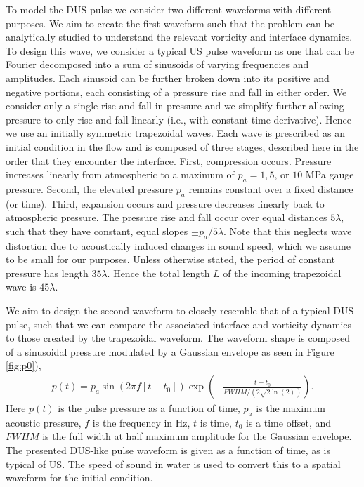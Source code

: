 To model the \ac{DUS} pulse we consider two different waveforms with
different purposes. We aim to create the first waveform such that the
problem can be analytically studied to understand the relevant
vorticity and interface dynamics. To design this wave, we consider a
typical \ac{US} pulse waveform as one that can be Fourier decomposed
into a sum of sinusoids of varying frequencies and amplitudes. Each
sinusoid can be further broken down into its positive and negative
portions, each consisting of a pressure rise and fall in either
order. We consider only a single rise and fall in pressure and we
simplify further allowing pressure to only rise and fall linearly
(i.e., with constant time derivative). Hence we use an initially
symmetric trapezoidal waves. Each wave is prescribed as an initial
condition in the flow and is composed of three stages, described here
in the order that they encounter the interface. First, compression
occurs. Pressure increases linearly from atmospheric to a maximum of
$p_a=1, 5$, or $10$ MPa gauge pressure. Second, the elevated pressure
$p_a$ remains constant over a fixed distance (or time). Third,
expansion occurs and pressure decreases linearly back to atmospheric
pressure. The pressure rise and fall occur over equal distances
$5\lambda$, such that they have constant, equal slopes
$\pm p_{a}/5\lambda$. Note that this neglects wave distortion due to
acoustically induced changes in sound speed, which we assume to be
small for our purposes. Unless otherwise stated, the period of
constant pressure has length $35\lambda$. Hence the total length $L$
of the incoming trapezoidal wave is $45\lambda$. 

We aim to design the second waveform to closely resemble that of a
typical \ac{DUS} pulse, such that we can compare the associated
interface and vorticity dynamics to those created by the trapezoidal
waveform. The waveform shape is composed of a sinusoidal pressure
modulated by a Gaussian envelope as seen in Figure \ref{fig:p0}),
%
\begin{align} \label{eq:us_waveform}
p(t)=p_a \sin{\left( 2\pi f \left[ t-t_0\right]\right)}
\exp{\left(-\frac{t-t_0}{FWHM/\left(2\sqrt{2\ln{\left(2\right)}}\right)}\right)}.
\end{align}
%
Here $p(t)$ is the pulse pressure as a function of time, $p_a$ is the
maximum acoustic pressure, $f$ is the frequency in Hz, $t$ is time,
$t_0$ is a time offset, and $FWHM$ is the full width at half maximum
amplitude for the Gaussian envelope. The presented \ac{DUS}-like pulse
waveform is given as a function of time, as is typical of \ac{US}. The
speed of sound in water is used to convert this to a spatial waveform
for the initial condition.


